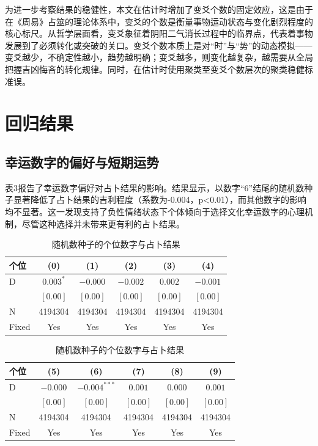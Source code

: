 \documentclass[11pt, a4paper, UTF8]{chinese-erj}
\begin{document}
为进一步考察结果的稳健性，本文在估计时增加了变爻个数的固定效应，这是由于在《周易》占筮的理论体系中，变爻的个数是衡量事物运动状态与变化剧烈程度的核心标尺。从哲学层面看，变爻象征着阴阳二气消长过程中的临界点，代表着事物发展到了必须转化或突破的关口。变爻个数本质上是对“时”与“势”的动态模拟——变爻越少，不确定性越小，趋势越明确；变爻越多，则变化越复杂，越需要从全局把握吉凶悔吝的转化规律。同时，在估计时使用聚类至变爻个数层次的聚类稳健标准误。

\section{回归结果}

\subsection{幸运数字的偏好与短期运势}

表3报告了幸运数字偏好对占卜结果的影响。结果显示，以数字“6”结尾的随机数种子显著降低了占卜结果的吉利程度（系数为-0.004，p<0.01），而其他数字的影响均不显著。这一发现支持了负性情绪状态下个体倾向于选择文化幸运数字的心理机制，尽管这种选择并未带来更有利的占卜结果。

\begin{table}[]
\centering
\caption{随机数种子的个位数字与占卜结果}
\begin{tabular}{lccccc}
\toprule
个位 & (0) & (1) & (2) & (3) & (4) \\
\midrule
D & $0.003^{*}$ & $-0.000$ & $-0.002$ & $0.002$ & $-0.001$ \\
  & $[0.00]$ & $[0.00]$ & $[0.00]$ & $[0.00]$ & $[0.00]$ \\
N & 4194304 & 4194304 & 4194304 & 4194304 & 4194304 \\
Fixed & Yes & Yes & Yes & Yes & Yes \\
\bottomrule
\end{tabular}

\vspace{1em}

\begin{tabular}{lccccc}
\toprule
个位 & (5) & (6) & (7) & (8) & (9) \\
\midrule
D & $-0.000$ & $-0.004^{***}$ & $0.001$ & $0.000$ & $0.001$ \\
  & $[0.00]$ & $[0.00]$ & $[0.00]$ & $[0.00]$ & $[0.00]$ \\
N & 4194304 & 4194304 & 4194304 & 4194304 & 4194304 \\
Fixed & Yes & Yes & Yes & Yes & Yes \\
\bottomrule
\end{tabular}
\end{table}
\end{document}
